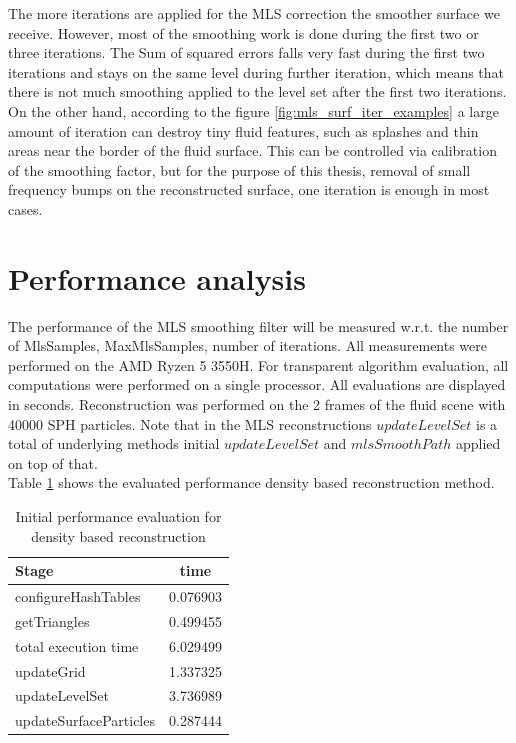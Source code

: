 The more iterations are applied for the MLS correction the smoother surface we receive. However, most of the smoothing work is done during the first two or three iterations. The Sum of squared errors falls very fast during the first two iterations and stays on the same level during further iteration, which means that there is not much smoothing applied to the level set after the first two iterations. On the other hand, according to the figure \ref{fig:mls_surf_iter_examples} a large amount of iteration can destroy tiny fluid features, such as splashes and thin areas near the border of the fluid surface. This can be controlled via calibration of the smoothing factor, but for the purpose of this thesis, removal of small frequency bumps on the reconstructed surface, one iteration is enough in most cases.

\section{Performance analysis}
The performance of the MLS smoothing filter will be measured w.r.t. the number of MlsSamples, MaxMlsSamples, number of iterations. All measurements were performed on the AMD Ryzen 5 3550H. For transparent algorithm evaluation, all computations were performed on a single processor. All evaluations are displayed in seconds. Reconstruction was performed on the 2 frames of the fluid scene with 40000 SPH particles. Note that in the MLS reconstructions $updateLevelSet$ is a total of underlying methods initial $updateLevelSet$ and $mlsSmoothPath$ applied on top of that.\\
Table \ref{tab:mls_initial_method} shows the evaluated performance density based reconstruction method.
\begin{table}[H]
	\begin{center}
		\scriptsize
		\begin{tabular}{|l|c|}
			\hline
			Stage & time \\
			\hline
				configureHashTables	&	0.076903\\
				getTriangles	&	0.499455\\
				total execution time	&	6.029499\\
				updateGrid	&	1.337325\\
				updateLevelSet	&	3.736989\\
				updateSurfaceParticles	&	0.287444\\
			\hline
		\end{tabular}
	\end{center}
	\caption{Initial performance evaluation for density based reconstruction}
	\label{tab:mls_initial_method}
\end{table}
